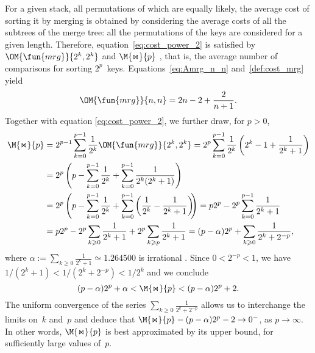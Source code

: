 For a given stack, all permutations of which are equally likely, the
average cost of sorting it by merging is obtained by considering the
average costs of all the subtrees of the merge tree: all the
permutations of the keys are considered for a given length. Therefore,
equation~\eqref{eq:cost_power_2} is satisfied by
\(\OM{\fun{mrg}}{2^k,2^k}\) and \(\M{\Join}{p}\)
, that is, the average number of comparisons
for sorting \(2^p\)~keys. Equations~\eqref{eq:Amrg_n_n}
and~\eqref{def:cost_mrg} yield
\begin{equation*}
\OM{\fun{mrg}}{n,n} = 2n - 2 + \frac{2}{n+1}.
\index{mrg@$\OM{\fun{mrg}}{n,n}$}
\end{equation*}
Together with equation \eqref{eq:cost_power_2}, we further draw, for
\(p > 0\),
\begin{align}
\M{\Join}{p}
  &= 2^{p-1}\sum_{k=0}^{p-1}{\frac{1}{2^k}\OM{\fun{mrg}}{2^k,2^k}}
  = 2^p\sum_{k=0}^{p-1}{\frac{1}{2^k}\left(2^k - 1 + \frac{1}{2^k +
      1}\right)}\notag\\
  &= 2^{p}\left(p - \sum_{k=0}^{p-1}{\frac{1}{2^k}}
     + \sum_{k=0}^{p-1}{\frac{1}{2^k(2^k+1)}}\right)\notag\\
  &= 2^{p}\left(p - \sum_{k=0}^{p-1}{\frac{1}{2^k}}
     + \sum_{k=0}^{p-1}\left(\frac{1}{2^k}
     - \frac{1}{2^k+1}\right)\!\!\right)
   = p2^p - 2^p \sum_{k=0}^{p-1}\frac{1}{2^k+1}\notag\\
  &= p2^p - 2^p \sum_{k \geqslant 0}\frac{1}{2^k+1}
     + 2^p \sum_{k \geqslant p}\frac{1}{2^k+1}
= (p - \alpha) 2^p + \sum_{k \geqslant 0}\frac{1}{2^{k}+2^{-p}},
\label{eq:Mjoin}
\end{align}
where \(\alpha := \sum_{k \geqslant 0}\frac{1}{2^k+1} \simeq
1.264500\) is irrational \citep{Borwein_1992}. Since \(0 < 2^{-p} <
1\), we have \(1/(2^k + 1) < 1/(2^k+2^{-p}) < 1/2^k\) and we conclude
\begin{equation}
(p - \alpha)2^p + \alpha < \M{\Join}{p} < (p-\alpha)2^p + 2.
\label{ineq:M_join}
\end{equation}
The uniform convergence of the series \(\sum_{k \geqslant
  0}\frac{1}{2^{k}+2^{-p}}\) allows us to interchange the limits
on~\(k\) and~\(p\) and deduce that \(\M{\Join}{p} - (p-\alpha)2^p - 2
\to 0^{-}\), as \(p \to \infty\). In other words,
\(\M{\Join}{p}\) is best approximated by its upper bound, for
sufficiently large values of~\(p\).

